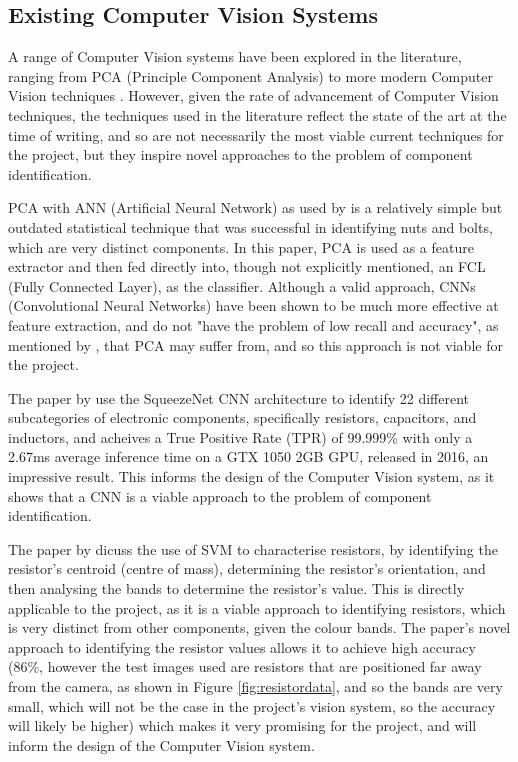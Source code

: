 \subsection{Existing Computer Vision Systems}
A range of Computer Vision systems have been explored in the literature, ranging from PCA (Principle Component Analysis) \citet{Dhenge2013MechanicalNS} to more modern Computer Vision techniques \citet{Xu2020,s22239079}. However, given the rate of advancement of Computer Vision
techniques, the techniques used in the literature reflect the state of the art at the time of writing, and so are not necessarily the most viable current techniques for the project, but they inspire novel approaches to the problem of component identification.

PCA with ANN (Artificial Neural Network) as used by \citet{Dhenge2013MechanicalNS} is a relatively simple but outdated statistical technique that was successful in identifying nuts and bolts, which are very distinct components. 
In this paper, PCA is used as a feature extractor and then fed directly into, though not explicitly mentioned, an FCL (Fully Connected Layer), as the classifier. Although a valid approach, CNNs (Convolutional Neural Networks) have been shown to be much more
effective at feature extraction, and do not "have the problem of low recall and accuracy", as mentioned by \citet{Xu2020}, that PCA may suffer from, and so this approach is not viable for the project. 

The paper by \citet{Xu2020} use the SqueezeNet CNN architecture to identify 22 different subcategories of electronic components, specifically resistors, capacitors, and inductors, and acheives a True Positive Rate (TPR) of 99.999\% with only a 2.67ms average inference time on a 
GTX 1050 2GB GPU, released in 2016, an impressive result. This informs the design of the Computer Vision system, as it shows that a CNN is a viable approach to the problem of component identification.

The paper by \citet{8939034} dicuss the use of SVM to characterise resistors, by identifying the resistor's centroid (centre of mass), determining the resistor's orientation, and then analysing the bands to determine the resistor's value.
This is directly applicable to the project, as it is a viable approach to identifying resistors, which is very distinct from other components, given the colour bands. The paper's novel approach to identifying the resistor values allows it to achieve high accuracy (86\%, however
the test images used are resistors that are positioned far away from the camera, as shown in Figure \ref*{fig:resistordata}, and so the bands are very small, which will not be the case in the project's vision system, so the accuracy will likely be higher) which makes it very promising for the project,
and will inform the design of the Computer Vision system.


